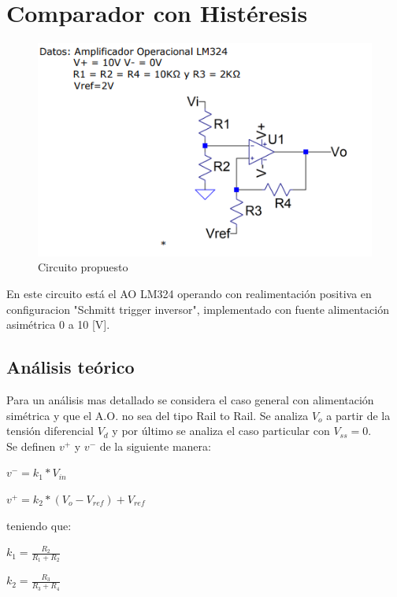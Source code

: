 \newpage
\section{Comparador con Histéresis}
\onehalfspacing
\begin{figure}[htb]
	\centering
	\includegraphics[width=1\textwidth]{figuras/Circuito4_consigna.png}
	\caption{Circuito propuesto}
\end{figure}
En este circuito está el AO LM324 operando con realimentación positiva en configuracion "Schmitt trigger inversor", implementado con fuente alimentación asimétrica 0 a 10 [V].
\subsection{Análisis teórico}
Para un análisis mas detallado se considera el caso general con alimentación simétrica y que el A.O. no sea del tipo Rail to Rail. Se analiza $V_o$ a partir de la tensión diferencial $V_d$ y por último se analiza el caso particular con $V_{ss}=0$.\\
Se definen $v^+$ y $v^-$ de la siguiente manera:
\begin{center}
	$v^- = k_1 * V_{in}$
\end{center}
\begin{center}
	$v^+ = k_2 * (V_o - V_{ref})+V_{ref}$
\end{center}
teniendo que:
\begin{center}
	$k_1 = \frac{R_2}{R_1 + R_2}$
\end{center}
\begin{center}
	$k_2 = \frac{R_3}{R_3 + R_4}$
\end{center}

